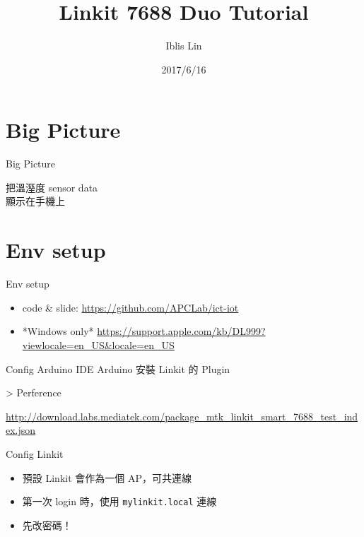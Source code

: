 \documentclass{beamer}
\begin{document}
\title[Linkit 7688 Duo Tutorial]{Linkit 7688 Duo Tutorial}

\author{Iblis Lin}

\date{2017/6/16}

\begin{frame}
  \titlepage
\end{frame}


\section{Big Picture}

\begin{frame}{Big Picture}
  \begin{center}
    \Huge
    把溫溼度 sensor data \\
    顯示在手機上
  \end{center}
\end{frame}


\section{Env setup}

\begin{frame}{Env setup}
  \begin{itemize}
    \item code \& slide: \url{https://github.com/APCLab/ict-iot}

    \item *Windows only* \url{https://support.apple.com/kb/DL999?viewlocale=en_US&locale=en_US}
  \end{itemize}
\end{frame}

\begin{frame}{Config Arduino IDE}
  Arduino 安裝 Linkit 的 Plugin

  > Perference

  \url{http://download.labs.mediatek.com/package_mtk_linkit_smart_7688_test_index.json}
\end{frame}

\begin{frame}[fragile]{Config Linkit}
  \Large
  \begin{itemize}
    \item 預設 Linkit 會作為一個 AP，可共連線

    \item 第一次 login 時，使用 \verb|mylinkit.local| 連線

    \item 先改密碼！
  \end{itemize}
\end{frame}
\end{document}
